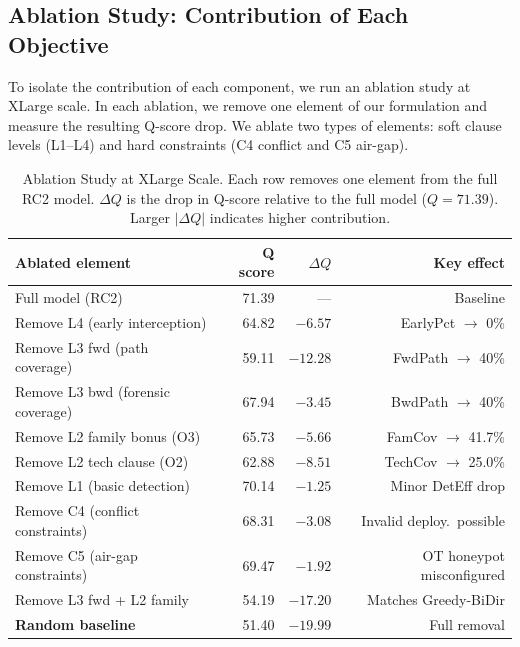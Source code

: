 \documentclass[journal]{IEEEtran}
\begin{document}
\subsection{Ablation Study: Contribution of Each Objective}
\label{subsec:ablation}

To isolate the contribution of each component, we run an
ablation study at XLarge scale.
In each ablation, we remove one element of our formulation
and measure the resulting Q-score drop.
We ablate two types of elements: soft clause levels
(L1--L4) and hard constraints (C4 conflict and C5 air-gap).

\begin{table}[htbp]
\caption{Ablation Study at XLarge Scale.
         Each row removes one element from the full
         RC2 model.
         $\Delta Q$ is the drop in Q-score relative to
         the full model ($Q=71.39$).
         Larger $|\Delta Q|$ indicates higher contribution.}
\label{tab:ablation}
\centering\renewcommand{\arraystretch}{1.25}
\begin{tabular}{@{}lrrr@{}}
\toprule
\textbf{Ablated element} & \textbf{Q score}
  & \textbf{$\Delta Q$} & \textbf{Key effect}\\
\midrule
Full model (RC2)            & 71.39 & ---   & Baseline \\
\midrule
Remove L4 (early interception)
  & 64.82 & $-6.57$ & EarlyPct $\to$ 0\% \\
Remove L3 fwd (path coverage)
  & 59.11 & $-12.28$ & FwdPath $\to$ 40\% \\
Remove L3 bwd (forensic coverage)
  & 67.94 & $-3.45$ & BwdPath $\to$ 40\% \\
Remove L2 family bonus (O3)
  & 65.73 & $-5.66$ & FamCov $\to$ 41.7\% \\
Remove L2 tech clause (O2)
  & 62.88 & $-8.51$ & TechCov $\to$ 25.0\% \\
Remove L1 (basic detection)
  & 70.14 & $-1.25$ & Minor DetEff drop \\
\midrule
Remove C4 (conflict constraints)
  & 68.31 & $-3.08$ & Invalid deploy.\ possible \\
Remove C5 (air-gap constraints)
  & 69.47 & $-1.92$ & OT honeypot misconfigured \\
Remove L3 fwd + L2 family
  & 54.19 & $-17.20$ & Matches Greedy-BiDir \\
\midrule
\textbf{Random baseline}   & 51.40 & $-19.99$ & Full removal \\
\bottomrule
\end{tabular}
\end{table}
\end{document}
